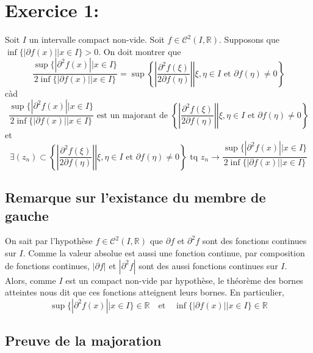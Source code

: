 \documentclass[a4paper, 12pt]{article}
\begin{document}
\newpage
\tableofcontents

\newpage

\section{Exercice 1:}

Soit \( I \) un intervalle compact non-vide. Soit \( f \in \mathcal{C}^2(I, \mathbb{R}) \). Supposons que \( \inf\{|\partial f(x)| | x \in I\} > 0 \). On doit montrer que
$$
\frac{\sup \{ | \partial^2 f(x) || x \in I \}}{2 \inf \{ |\partial f(x)|| x \in I \}}
= \sup \left\{ \left. \left| \frac{\partial^2f(\xi)}{2\partial f(\eta)} \right| \right| \xi, \eta \in I \text{ et } \partial f(\eta) \neq 0 \right\}
$$
càd
\begin{equation}
    \label{eq:1.maj}
    \frac{\sup \{ | \partial^2 f(x) || x \in I \}}{2 \inf \{ |\partial f(x)|| x \in I \}} \text{ est un majorant de }
    \left\{ \left. \left| \frac{\partial^2f(\xi)}{2\partial f(\eta)} \right| \right| \xi, \eta \in I \text{ et } \partial f(\eta) \neq 0 \right\}
\end{equation}
et
\begin{equation}
    \label{eq:1.conv}
    \exists (z_n) \subset
    \left\{ \left. \left| \frac{\partial^2f(\xi)}{2\partial f(\eta)} \right| \right| \xi, \eta \in I \text{ et } \partial f(\eta) \neq 0 \right\}
    \text{ tq } z_n \to
    \frac{\sup \{ | \partial^2 f(x) || x \in I \}}{2 \inf \{ |\partial f(x)|| x \in I \}}
\end{equation}

\subsection{Remarque sur l'existance du membre de gauche}

On sait par l'hypothèse \( f \in \mathcal{C}^2(I, \mathbb{R}) \) que \( \partial f \) et \( \partial^2 f \) sont des fonctions continues sur \( I \). Comme la valeur absolue est aussi une fonction continue, par composition de fonctions continues, \( | \partial f | \) et \( | \partial^2 f | \) sont des aussi fonctions continues sur \( I \). \\
Alors, comme \( I \) est un compact non-vide par hypothèse, le théorème des bornes atteintes nous dit que ces fonctions atteignent leurs bornes. En particulier,
$$
\sup \{ | \partial^2 f(x) || x \in I \} \in \mathbb{R} \quad \text{et} \quad 
\inf \{ |\partial f(x)|| x \in I \} \in \mathbb{R}
$$

\subsection{Preuve de la majoration}
\end{document}
